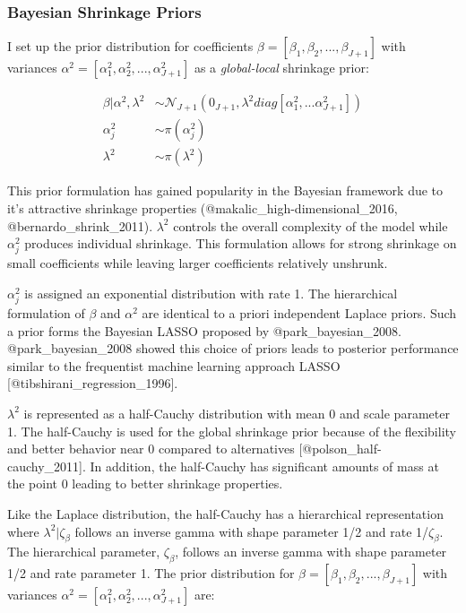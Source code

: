 \documentclass[
]{article}
\begin{document}
\hypertarget{bayesian-shrinkage-priors}{%
\subsubsection{Bayesian Shrinkage
Priors}\label{bayesian-shrinkage-priors}}

I set up the prior distribution for coefficients
\({\beta}=[\beta_1,\beta_2,...,\beta_{J+1}]\) with variances
\(\alpha^2=[\alpha_1^2,\alpha_2^2,...,\alpha_{J+1}^2]\) as a
\emph{global-local} shrinkage prior:

\[
\begin{aligned}
\beta | \alpha^2, \lambda^2 &\sim \mathcal{N}_{J+1} (0_{J+1}, \lambda^2 diag[\alpha_1^2,...\alpha_{J+1}^2])\\
\alpha_j^2  &\sim \pi(\alpha_j^2)\\
\lambda^2 &\sim \pi(\lambda^2)
\end{aligned}
\]

This prior formulation has gained popularity in the Bayesian framework
due to it's attractive shrinkage properties
(@makalic\_high-dimensional\_2016, @bernardo\_shrink\_2011).
\(\lambda^2\) controls the overall complexity of the model while
\(\alpha_j^2\) produces individual shrinkage. This formulation allows
for strong shrinkage on small coefficients while leaving larger
coefficients relatively unshrunk.

\(\alpha_j^2\) is assigned an exponential distribution with rate 1. The
hierarchical formulation of \(\beta\) and \(\alpha^2\) are identical to
a priori independent Laplace priors. Such a prior forms the Bayesian
LASSO proposed by @park\_bayesian\_2008. @park\_bayesian\_2008 showed
this choice of priors leads to posterior performance similar to the
frequentist machine learning approach LASSO
{[}@tibshirani\_regression\_1996{]}.

\(\lambda^2\) is represented as a half-Cauchy distribution with mean 0
and scale parameter 1. The half-Cauchy is used for the global shrinkage
prior because of the flexibility and better behavior near 0 compared to
alternatives {[}@polson\_half-cauchy\_2011{]}. In addition, the
half-Cauchy has significant amounts of mass at the point 0 leading to
better shrinkage properties.

Like the Laplace distribution, the half-Cauchy has a hierarchical
representation where \(\lambda^2|\zeta_{\beta}\) follows an inverse
gamma with shape parameter 1/2 and rate 1/\(\zeta_{\beta}\). The
hierarchical parameter, \(\zeta_\beta\), follows an inverse gamma with
shape parameter 1/2 and rate parameter 1. The prior distribution for
\(\beta=[\beta_1,\beta_2,...,\beta_{J+1}]\) with variances
\(\alpha^2=[\alpha_1^2,\alpha_2^2,...,\alpha_{J+1}^2]\) are:
\end{document}
